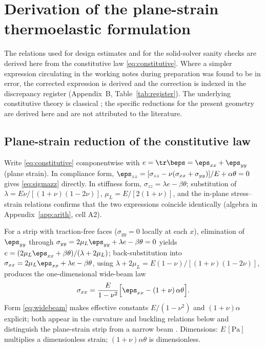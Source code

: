 \chapter{Derivation of the plane-strain thermoelastic formulation}
\label{ch:derivations}

The relations used for design estimates and for the solid-solver sanity checks are derived here
from the constitutive law \eqref{eq:constitutive}. Where a simpler expression circulating in the
working notes during preparation was found to be in error, the corrected expression is derived and
the correction is indexed in the discrepancy register (Appendix~B, Table~\ref{tab:register}). The
underlying constitutive theory is classical \cite{boley1960theory,timoshenko1970elasticity}; the
specific reductions for the present geometry are derived here and are not attributed to the
literature.

\section{Plane-strain reduction of the constitutive law}
\label{sec:deriv:planestrain}
Write \eqref{eq:constitutive} componentwise with $e=\tr\beps=\eps_{xx}+\eps_{yy}$ (plane strain).
In compliance form, $\eps_{zz}=[\sigma_{zz}-\nu(\sigma_{xx}+\sigma_{yy})]/E+\alpha\theta=0$ gives
\eqref{eq:sigmazz} directly. In stiffness form, $\sigma_{zz}=\lambda e-\beta\theta$; substitution
of $\lambda=E\nu/[(1+\nu)(1-2\nu)]$, $\mu_L=E/[2(1+\nu)]$, and the in-plane stress--strain relations
confirms that the two expressions coincide identically (algebra in Appendix~\ref{app:arith}, cell
A2).

For a strip with traction-free faces ($\sigma_{yy}=0$ locally at each $x$), elimination of
$\eps_{yy}$ through $\sigma_{yy}=2\mu_L\eps_{yy}+\lambda e-\beta\theta=0$ yields
$e=(2\mu_L\eps_{xx}+\beta\theta)/(\lambda+2\mu_L)$; back-substitution into
$\sigma_{xx}=2\mu_L\eps_{xx}+\lambda e-\beta\theta$, using
$\lambda+2\mu_L=E(1-\nu)/[(1+\nu)(1-2\nu)]$, produces the one-dimensional wide-beam law
\begin{equation}
\sigma_{xx}=\frac{E}{1-\nu^2}\Big[\eps_{xx}-(1+\nu)\,\alpha\theta\Big].
\label{eq:widebeam}
\end{equation}
Form \eqref{eq:widebeam} makes effective constants $E/(1-\nu^2)$ and $(1+\nu)\alpha$ explicit; both
appear in the curvature and buckling relations below and distinguish the plane-strain strip from a
narrow beam \cite{boley1960theory}. Dimensions: $E\,[\mathrm{Pa}]$ multiplies a dimensionless
strain; $(1+\nu)\alpha\theta$ is dimensionless.


